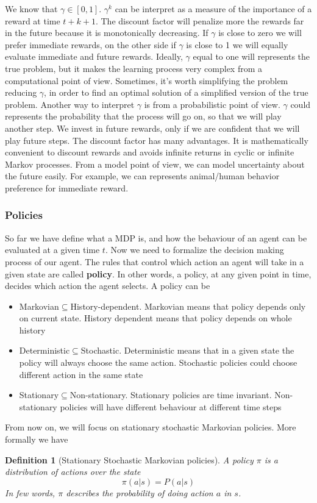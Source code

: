 \documentclass[main.tex]{subfiles}
\newtheorem{definition}{Definition}[section]
\begin{document}
We know that $\gamma \in [0,1]$. $\gamma^k$ can be interpret as a measure of the importance of a reward at time $t+k+1$. The discount factor will penalize more the rewards far in the future because it is monotonically decreasing. If $\gamma$ is close to zero we will prefer immediate rewards, on the other side if $\gamma$ is close to 1 we will equally evaluate immediate and future rewards. Ideally, $\gamma$ equal to one will represents the true problem, but it makes the learning process very complex from a computational point of view. Sometimes, it's worth simplifying the problem reducing $\gamma$, in order to find an optimal solution of a simplified version of the true problem. Another way to interpret $\gamma$ is from a probabilistic point of view. $\gamma$ could represents the probability that the process will go on, so that we will play another step. We invest in future rewards, only if we are confident that we will play future steps. The discount factor has many advantages. It is mathematically convenient to discount rewards and avoids infinite returns in cyclic or infinite Markov processes. From a model point of view, we can model uncertainty about the future easily. For example, we can represents animal/human behavior preference for immediate reward.

\subsubsection{Policies} So far we have define what a MDP is, and how the behaviour of an agent can be evaluated at a given time $t$. Now we need to formalize the decision making process of our agent. The rules that control which action an agent will take in a given state are called \textbf{policy}. In other words, a policy, at any given point in time, decides which action the agent selects. A policy can be
\begin{itemize}
    \item Markovian$\subseteq$History-dependent. Markovian means that policy depends only on current state. History dependent means that policy depends on whole history
    \item Deterministic$\subseteq$Stochastic. Deterministic means that in a given state the policy will always choose the same action. Stochastic policies could choose different action in the same state
    \item Stationary$\subseteq$Non-stationary. Stationary policies are time invariant. Non-stationary policies will have different behaviour at different time steps
\end{itemize}
From now on, we will focus on stationary stochastic Markovian policies. More formally we have
\begin{definition}[Stationary Stochastic Markovian policies]
    A policy $\pi$ is a distribution of actions over the state
    \begin{equation*}
        \pi(a|s) = P(a|s)
    \end{equation*}
    In few words, $\pi$ describes the probability of doing action $a$ in $s$.
\end{definition}
\end{document}
